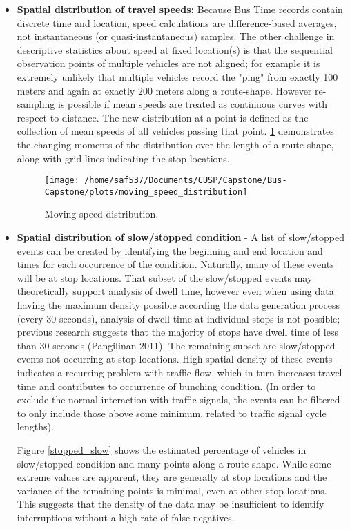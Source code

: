 \documentclass[12pt,journal,compsoc]{IEEEtran}
\begin{document}
\begin{itemize}
\item \textbf{Spatial distribution of travel speeds:} Because Bus Time records contain discrete time and location, speed calculations are difference-based averages, not instantaneous (or quasi-instantaneous) samples.  The other challenge in descriptive statistics about speed at fixed location(s) is that the sequential observation points of multiple vehicles are not aligned; for example it is extremely unlikely that multiple vehicles record the "ping" from exactly 100 meters and again at exactly 200 meters along a route-shape.  However re-sampling is possible if mean speeds are treated as continuous curves with respect to distance.  The new distribution at a point is defined as the collection of mean speeds of all vehicles passing that point.  \ref{msd} demonstrates the changing moments of the distribution over the length of a route-shape, along with grid lines indicating the stop locations.

\begin{center}
\begin{figure}[!ht]
  \caption{Moving speed distribution.}
  \label{msd}
  \centering
    \texttt{[image: /home/saf537/Documents/CUSP/Capstone/Bus-Capstone/plots/moving\_speed\_distribution]}
\end{figure}
\end{center}

\item \textbf{Spatial distribution of slow/stopped condition} - A list of slow/stopped events can be created by identifying the beginning and end location and times for each occurrence of the condition.  Naturally, many of these events will be at stop locations.   That subset of the slow/stopped events may theoretically support analysis of dwell time, however even when using data having the maximum density possible according the data generation process (every 30 seconds), analysis of dwell time at individual stops is not possible; previous research suggests that the majority of stops have dwell time of less than 30 seconds (Pangilinan 2011).  The remaining subset are slow/stopped events not occurring at stop locations.  High spatial density of these events indicates a recurring problem with traffic flow, which in turn increases travel time and contributes to occurrence of bunching condition.  (In order to exclude the normal interaction with traffic signals, the events can be filtered to only include those above some minimum, related to traffic signal cycle lengths).

Figure \ref{stopped_slow} shows the estimated percentage of vehicles in slow/stopped condition and many points along a route-shape.  While some extreme values are apparent, they are generally at stop locations and the variance of the remaining points is minimal, even at other stop locations.  This suggests that the density of the data may be insufficient to identify interruptions without a high rate of false negatives.




\end{itemize}
\end{document}
